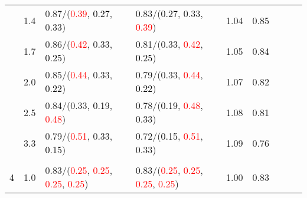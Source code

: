 \documentclass[10pt,a4paper]{report}
\begin{document}
\begin{table}[!htbp]
\begin{center}
{\begin{tabular}{ccllccccc}
				  & 1.4                               & 0.87/(\textcolor{red}{0.39}, \textcolor{black}{0.27}, 0.33)                                                                                     & 0.83/(\textcolor{black}{0.27}, 0.33, \textcolor{red}{0.39})                                                                                     & 1.04             & 0.85                     \\
				  & 1.7                               & 0.86/(\textcolor{red}{0.42}, 0.33, \textcolor{black}{0.25})                                                                                     & 0.81/(0.33, \textcolor{red}{0.42}, \textcolor{black}{0.25})                                                                                     & 1.05             & 0.84                     \\
				  & 2.0                               & 0.85/(\textcolor{red}{0.44}, 0.33, \textcolor{black}{0.22})                                                                                     & 0.79/(0.33, \textcolor{red}{0.44}, \textcolor{black}{0.22})                                                                                     & 1.07             & 0.82                     \\
				  & 2.5                               & 0.84/(0.33, \textcolor{black}{0.19}, \textcolor{red}{0.48})                                                                                     & 0.78/(\textcolor{black}{0.19}, \textcolor{red}{0.48}, 0.33)                                                                                     & 1.08             & 0.81                     \\
				  & 3.3                               & 0.79/(\textcolor{red}{0.51}, 0.33, \textcolor{black}{0.15})                                                                                     & 0.72/(\textcolor{black}{0.15}, \textcolor{red}{0.51}, 0.33)                                                                                     & 1.09             & 0.76                     \\
				  &                                   &                                                                                                                                                 &                                                                                                                                                 &                                             \\
				4 & 1.0                               & 0.83/(\textcolor{red}{0.25}, \textcolor{red}{0.25}, \textcolor{red}{0.25}, \textcolor{red}{0.25})                                               & 0.83/(\textcolor{red}{0.25}, \textcolor{red}{0.25}, \textcolor{red}{0.25}, \textcolor{red}{0.25})                                               & 1.00             & 0.83                     \\

\end{tabular}}
\end{center}
\end{table}
\end{document}
